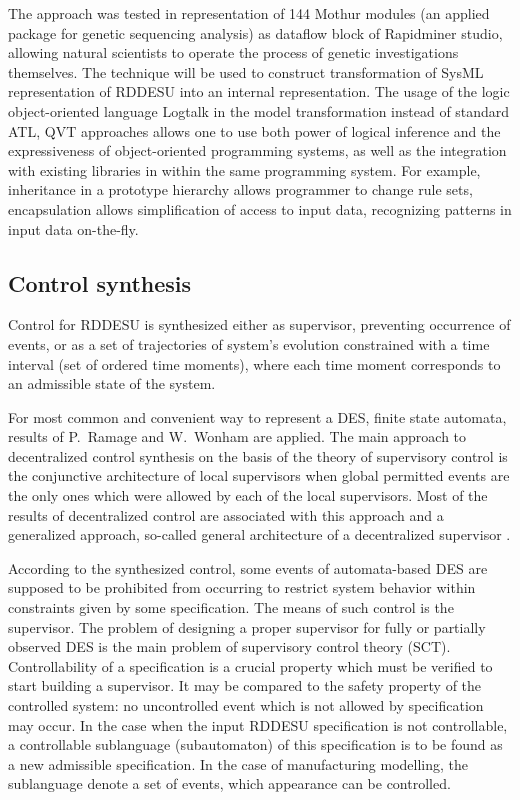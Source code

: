 \documentclass[conference]{IEEEtran}
\begin{document}
The approach was tested in representation of 144 Mothur modules (an applied package for genetic sequencing analysis) as dataflow block of Rapidminer studio, allowing natural scientists to operate the process of genetic investigations themselves. The technique will be used to construct transformation of SysML representation of RDDESU into an internal representation. The usage of the logic object-oriented language Logtalk in the model transformation instead of standard ATL, QVT approaches allows one to use both power of logical inference and the expressiveness of object-oriented programming systems, as well as the integration with existing libraries in within the same programming system. For example, inheritance in a prototype hierarchy allows programmer to change rule sets, encapsulation allows simplification of access to input data, recognizing patterns in input data on-the-fly.

\subsection{Control synthesis}
\label{sec:sub-control-syn}

Control for RDDESU is synthesized either as supervisor, preventing occurrence of events, or as a set of trajectories of system’s evolution constrained with a time interval (set of ordered time moments), where each time moment corresponds to an admissible state of the system.

For most common and convenient way to represent a DES, finite state automata, results of P.~Ramage and W.~Wonham \cite{tsyoo} are applied. The main approach to decentralized control synthesis on the basis of the theory of supervisory control is the conjunctive architecture of local supervisors when global permitted events are the only ones which were allowed by each of the local supervisors. Most of the results of decentralized control are associated with this approach \cite{tsyoo} and a generalized approach, so-called general architecture of a decentralized supervisor \cite{tsyoo}.

According to the synthesized control, some events of automata-based DES are supposed to be prohibited from occurring to restrict system behavior within constraints given by some specification. The means of such control is the supervisor. The problem of designing a proper supervisor for fully or partially observed DES is the main problem of supervisory control theory (SCT). Controllability of a specification is a crucial property which must be verified to start building a supervisor. It may be compared to the safety property of the controlled system: no uncontrolled event which is not allowed by specification may occur. In the case when the input RDDESU specification is not controllable, a controllable sublanguage (subautomaton) of this specification is to be found as a new admissible specification. In the case of manufacturing modelling, the sublanguage denote a set of events, which appearance can be controlled. %
\end{document}
